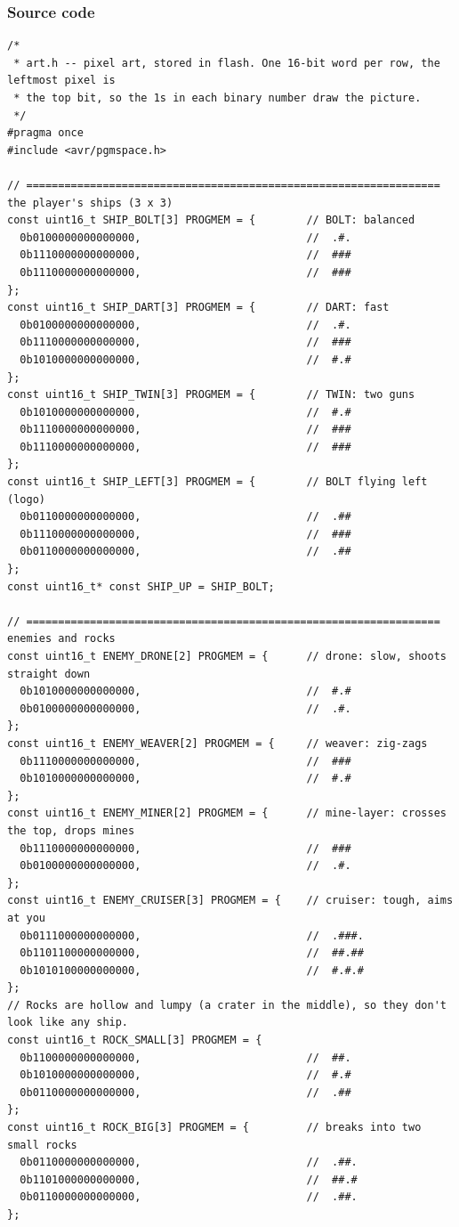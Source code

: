 \documentclass[11pt,a4paper]{article}
\begin{document}
\subsubsection*{Source code}
\begin{lstlisting}[language=Arduino]
/*
 * art.h -- pixel art, stored in flash. One 16-bit word per row, the leftmost pixel is
 * the top bit, so the 1s in each binary number draw the picture.
 */
#pragma once
#include <avr/pgmspace.h>

// ================================================================= the player's ships (3 x 3)
const uint16_t SHIP_BOLT[3] PROGMEM = {        // BOLT: balanced
  0b0100000000000000,                          //  .#.
  0b1110000000000000,                          //  ###
  0b1110000000000000,                          //  ###
};
const uint16_t SHIP_DART[3] PROGMEM = {        // DART: fast
  0b0100000000000000,                          //  .#.
  0b1110000000000000,                          //  ###
  0b1010000000000000,                          //  #.#
};
const uint16_t SHIP_TWIN[3] PROGMEM = {        // TWIN: two guns
  0b1010000000000000,                          //  #.#
  0b1110000000000000,                          //  ###
  0b1110000000000000,                          //  ###
};
const uint16_t SHIP_LEFT[3] PROGMEM = {        // BOLT flying left (logo)
  0b0110000000000000,                          //  .##
  0b1110000000000000,                          //  ###
  0b0110000000000000,                          //  .##
};
const uint16_t* const SHIP_UP = SHIP_BOLT;

// ================================================================= enemies and rocks
const uint16_t ENEMY_DRONE[2] PROGMEM = {      // drone: slow, shoots straight down
  0b1010000000000000,                          //  #.#
  0b0100000000000000,                          //  .#.
};
const uint16_t ENEMY_WEAVER[2] PROGMEM = {     // weaver: zig-zags
  0b1110000000000000,                          //  ###
  0b1010000000000000,                          //  #.#
};
const uint16_t ENEMY_MINER[2] PROGMEM = {      // mine-layer: crosses the top, drops mines
  0b1110000000000000,                          //  ###
  0b0100000000000000,                          //  .#.
};
const uint16_t ENEMY_CRUISER[3] PROGMEM = {    // cruiser: tough, aims at you
  0b0111000000000000,                          //  .###.
  0b1101100000000000,                          //  ##.##
  0b1010100000000000,                          //  #.#.#
};
// Rocks are hollow and lumpy (a crater in the middle), so they don't look like any ship.
const uint16_t ROCK_SMALL[3] PROGMEM = {
  0b1100000000000000,                          //  ##.
  0b1010000000000000,                          //  #.#
  0b0110000000000000,                          //  .##
};
const uint16_t ROCK_BIG[3] PROGMEM = {         // breaks into two small rocks
  0b0110000000000000,                          //  .##.
  0b1101000000000000,                          //  ##.#
  0b0110000000000000,                          //  .##.
};



\end{lstlisting}
\end{document}
